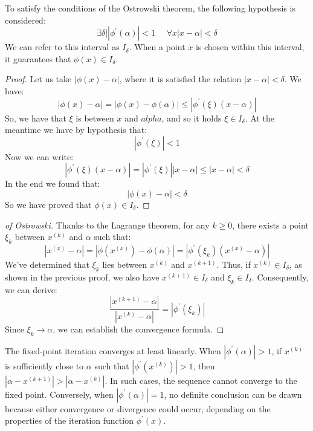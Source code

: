 To satisfy the conditions of the Ostrowski theorem, the following hypothesis is considered:
\[\exists \delta | \left\lvert \phi^{'}(\alpha) \right\rvert < 1 \:\:\:\:\:\: \forall x \left\lvert x - \alpha \right\rvert < \delta\]
We can refer to this interval as $I_{\delta}$. 
When a point $x$ is chosen within this interval, it guarantees that $\phi(x)\in I_{\delta}$. 
\begin{proof}
    Let us take $\left\lvert \phi(x)-\alpha \right\rvert$, where it is satisfied the relation $\left\lvert x- \alpha \right\rvert < \delta$. 
    We have:
    \[\left\lvert \phi(x)-\alpha \right\rvert=\left\lvert \phi(x)-\phi(\alpha) \right\rvert \leq \left\lvert \phi^{'}(\xi)(x-\alpha) \right\rvert \]
    So, we have that $\xi$ is between $x$ and $alpha$, and so it holds $\xi \in I_{\delta}$. 
    At the meantime we have by hypothesis that: 
    \[\left\lvert \phi^{'}(\xi) \right\rvert < 1\]
    Now we can write:
    \[\left\lvert \phi^{'}(\xi)(x-\alpha) \right\rvert = \left\lvert \phi^{'}(\xi) \right\rvert \left\lvert x-\alpha \right\rvert \leq \left\lvert x-\alpha \right\rvert < \delta\]
    In the end we found that: 
    \[\left\lvert \phi(x)-\alpha \right\rvert < \delta\]
    So we have proved that $\phi(x) \in I_{\delta}$. 
\end{proof}
\begin{proof}[of Ostrowski]
    Thanks to the Lagrange theorem, for any $k \geq 0$, there exists a point $\xi_k$ between $x^{(k)}$ and $\alpha$ such that: 
    \[\left\lvert x^{(x)}-\alpha\right\rvert=\left\lvert\phi(x^{(x)})-\phi(\alpha)\right\rvert=\left\lvert\phi^{'}(\xi_k)(x^{(x)}-\alpha)\right\rvert\]
    We've determined that $\xi_k$ lies between $x^{(k)}$ and $x^{(k+1)}$. 
    Thus, if $x^{(k)} \in I_{\delta}$, as shown in the previous proof, we also have $x^{(k+1)} \in I_{\delta}$ and $\xi_k \in I_{\delta}$. 
    Consequently, we can derive:
    \[\dfrac{\left\lvert x^{(k+1)}-\alpha\right\rvert }{\left\lvert x^{(k)}-\alpha\right\rvert }=\left\lvert \phi^{'}(\xi_k)\right\rvert \]
    Since $\xi_k \rightarrow \alpha$, we can establish the convergence formula.
\end{proof}
The fixed-point iteration converges at least linearly. 
When $\left\lvert\phi^{'}(\alpha)\right\rvert>1$, if $x^{(k)}$ is sufficiently close to $\alpha$ such that 
$\left\lvert \phi^{'}(x^{(k)}) \right\rvert > 1$, then $\left\lvert \alpha - x^{(k+1)} \right\rvert > \left\lvert \alpha - x^{(k)} \right\rvert$. 
In such cases, the sequence cannot converge to the fixed point.
Conversely, when $\left\lvert\phi^{'}(\alpha)\right\rvert=1$, no definite conclusion can be drawn because either convergence or divergence could occur, depending on the properties of the iteration function $\phi^{'}(x)$. 

